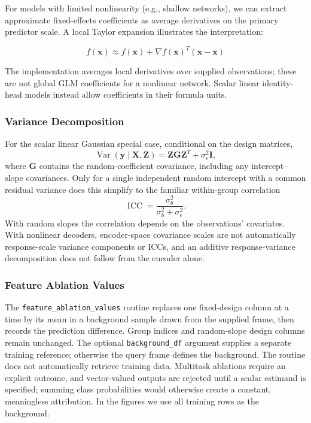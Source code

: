 \documentclass[12pt,a4paper]{article}
\newcommand{\bX}{\mathbf{X}}
\newcommand{\bZ}{\mathbf{Z}}
\newcommand{\by}{\mathbf{y}}
\begin{document}
For models with limited nonlinearity (e.g., shallow networks), we can extract approximate fixed-effects coefficients as average derivatives on the primary predictor scale. A local Taylor expansion illustrates the interpretation:

\begin{equation}
    f(\mathbf{x}) \approx f(\bar{\mathbf{x}}) + \nabla f(\bar{\mathbf{x}})^T(\mathbf{x} - \bar{\mathbf{x}})
\end{equation}

The implementation averages local derivatives over supplied observations; these are not global GLM coefficients for a nonlinear network. Scalar linear identity-head models instead allow coefficients in their formula units.

\subsubsection{Variance Decomposition}

For the scalar linear Gaussian special case, conditional on the design matrices,
\begin{equation}
 \operatorname{Var}(\by\mid\bX,\bZ)=\bZ\mathbf G\bZ^T+\sigma_\epsilon^2\mathbf I,
\end{equation}
where $\mathbf G$ contains the random-coefficient covariance, including any intercept--slope covariances. Only for a single independent random intercept with a common residual variance does this simplify to the familiar within-group correlation
\begin{equation}
 \operatorname{ICC}=\frac{\sigma_b^2}{\sigma_b^2+\sigma_\epsilon^2}.
\end{equation}
With random slopes the correlation depends on the observations' covariates. With nonlinear decoders, encoder-space covariance scales are not automatically response-scale variance components or ICCs, and an additive response-variance decomposition does not follow from the encoder alone.

\subsubsection{Feature Ablation Values}

The \texttt{feature\_ablation\_values} routine replaces one fixed-design column at a time by its mean in a background sample drawn from the supplied frame, then records the prediction difference. Group indices and random-slope design columns remain unchanged. The optional \texttt{background\_df} argument supplies a separate training reference; otherwise the query frame defines the background. The routine does not automatically retrieve training data. Multitask ablations require an explicit outcome, and vector-valued outputs are rejected until a scalar estimand is specified; summing class probabilities would otherwise create a constant, meaningless attribution. In the figures we use all training rows as the background.
\end{document}
